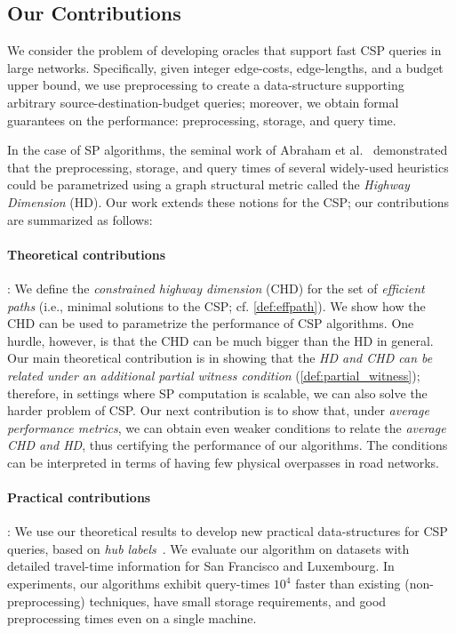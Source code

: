 \subsection{Our Contributions}
We consider the problem of developing oracles that support fast CSP queries in large networks. 
Specifically, given integer edge-costs, edge-lengths, and a budget upper bound, we use preprocessing to create a data-structure supporting arbitrary source-destination-budget queries; moreover, we obtain formal guarantees on the performance: preprocessing, storage, and query time.

In the case of SP algorithms, the seminal work of Abraham et al.~\citep{hd_journal, highway2010} demonstrated that the preprocessing, storage, and query times of several widely-used heuristics could be parametrized using a graph structural metric called the \emph{Highway Dimension} (HD).
Our work extends these notions for the CSP; our contributions are summarized as follows:

\paragraph{Theoretical contributions}: 
We define the \emph{constrained highway dimension} (CHD) for the set of {\em efficient paths} (i.e., minimal solutions to the CSP; cf. \cref{def:effpath}). 
We show how the CHD can be used to parametrize the performance of CSP algorithms.
One hurdle, however, is that the CHD can be much bigger than the HD in general.
Our main theoretical contribution is in showing that the \emph{HD and CHD can be related under an additional partial witness condition} (\cref{def:partial_witness}); therefore, in settings where SP computation is scalable, we can also solve the harder problem of CSP. 
Our next contribution is to show that, under \emph{average performance metrics}, we can obtain even weaker conditions to relate the \emph{average CHD and HD}, thus certifying the performance of our algorithms.
The conditions can be interpreted in terms of having few physical overpasses in road networks.

\paragraph{Practical contributions}: 
We use our theoretical results to develop new practical data-structures for CSP queries, based on {\em hub labels}~\citep{cohen_definition_hl}. 
We evaluate our algorithm on datasets with detailed travel-time information for San Francisco and Luxembourg.
In experiments, our algorithms exhibit query-times $10^4$ faster than existing (non-preprocessing) techniques, have small storage requirements, and good preprocessing times even on a single machine. 
 

